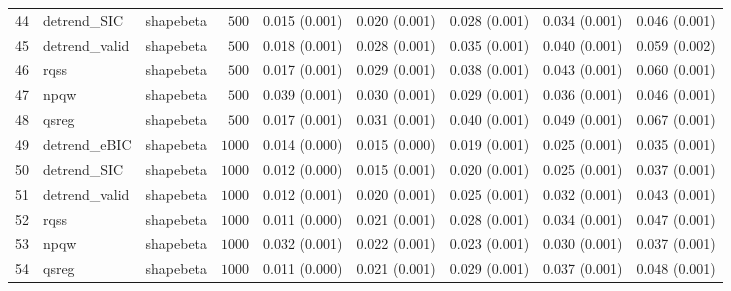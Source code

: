 \begin{table}[!tbp]
\begin{center}
\begin{tabular}{lllrlllll}
44&detrend_SIC&shapebeta&$ 500$&0.015 (0.001)&0.020 (0.001)&0.028 (0.001)&0.034 (0.001)&0.046 (0.001)\tabularnewline
45&detrend_valid&shapebeta&$ 500$&0.018 (0.001)&0.028 (0.001)&0.035 (0.001)&0.040 (0.001)&0.059 (0.002)\tabularnewline
46&rqss&shapebeta&$ 500$&0.017 (0.001)&0.029 (0.001)&0.038 (0.001)&0.043 (0.001)&0.060 (0.001)\tabularnewline
47&npqw&shapebeta&$ 500$&0.039 (0.001)&0.030 (0.001)&0.029 (0.001)&0.036 (0.001)&0.046 (0.001)\tabularnewline
48&qsreg&shapebeta&$ 500$&0.017 (0.001)&0.031 (0.001)&0.040 (0.001)&0.049 (0.001)&0.067 (0.001)\tabularnewline
49&detrend_eBIC&shapebeta&$1000$&0.014 (0.000)&0.015 (0.000)&0.019 (0.001)&0.025 (0.001)&0.035 (0.001)\tabularnewline
50&detrend_SIC&shapebeta&$1000$&0.012 (0.000)&0.015 (0.001)&0.020 (0.001)&0.025 (0.001)&0.037 (0.001)\tabularnewline
51&detrend_valid&shapebeta&$1000$&0.012 (0.001)&0.020 (0.001)&0.025 (0.001)&0.032 (0.001)&0.043 (0.001)\tabularnewline
52&rqss&shapebeta&$1000$&0.011 (0.000)&0.021 (0.001)&0.028 (0.001)&0.034 (0.001)&0.047 (0.001)\tabularnewline
53&npqw&shapebeta&$1000$&0.032 (0.001)&0.022 (0.001)&0.023 (0.001)&0.030 (0.001)&0.037 (0.001)\tabularnewline
54&qsreg&shapebeta&$1000$&0.011 (0.000)&0.021 (0.001)&0.029 (0.001)&0.037 (0.001)&0.048 (0.001)\tabularnewline
\hline
\end{tabular}\end{center}
\end{table}
